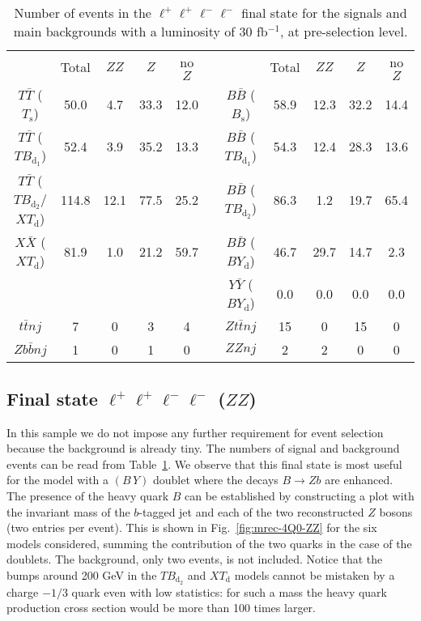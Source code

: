 \documentclass[12pt,a4paper]{article}
\newcommand{\TT}{T \bar T}
\newcommand{\BB}{B \bar B}
\newcommand{\XX}{X \bar X}
\newcommand{\YY}{Y \bar Y}
\newcommand{\Ts}{T_\text{s}}
\newcommand{\Bs}{B_\text{s}}
\newcommand{\TBd}{TB_{\text{d}_1}}
\newcommand{\TBD}{TB_{\text{d}_2}}
\newcommand{\XTd}{XT_\text{d}}
\newcommand{\BYd}{BY_\text{d}}
\newcommand{\BY}{(B \, Y)}
\begin{document}
\begin{table}[htb]
\begin{center}
\begin{small}
\begin{tabular}{ccccccccccc}
               & Total & $ZZ$ & $Z$  & no $Z$ & \quad &          & Total & $ZZ$ & $Z$ & no $Z$
\\[1mm]
$\TT$ ($\Ts$)  & 50.0  & 4.7  & 33.3 & 12.0   & & $\BB$ ($\Bs$)  & 58.9 & 12.3 & 32.2 & 14.4 \\
$\TT$ ($\TBd$) & 52.4  & 3.9  & 35.2 & 13.3   & & $\BB$ ($\TBd$) & 54.3 & 12.4 & 28.3 & 13.6 \\
$\TT$ ($\TBD$/$\XTd$) & 114.8 & 12.1 & 77.5 & 25.2 & & $\BB$ ($\TBD$) & 86.3 & 1.2 & 19.7 & 65.4 \\
$\XX$ ($\XTd$) & 81.9  & 1.0  & 21.2 & 59.7   & & $\BB$ ($\BYd$) & 46.7 & 29.7 & 14.7 & 2.3\\
               &       &      &      &        & & $\YY$ ($\BYd$) & 0.0  & 0.0  & 0.0  & 0.0  \\
\hline
$t \bar t nj$  & 7     & 0    & 3    & 4      & & $Z t \bar tnj$ & 15   & 0    &  15  & 0 \\
$Z b \bar bnj$ & 1     & 0    & 1    & 0      & & $ZZnj$         & 2    & 2    &  0   & 0
\end{tabular}
\end{small}
\end{center}
\caption{Number of events in the $\ell^+ \ell^+ \ell^- \ell^-$ final state for
the signals and main backgrounds with a luminosity of 30 fb$^{-1}$, at pre-selection level.}
\label{tab:nsnb-4Q0}
\end{table}



\subsection{Final state $\ell^+ \ell^+ \ell^- \ell^-$ ($ZZ$)}

In this sample we do not impose any further requirement for event selection because the background is already tiny. The numbers of signal and background events can be read from Table~\ref{tab:nsnb-4Q0}.
We observe that this final state is most useful for the model with a $\BY$ doublet where the decays $B \to Zb$ are enhanced. The presence of the heavy quark $B$ can be established by constructing a plot  with the invariant mass of the $b$-tagged jet and each of the two reconstructed $Z$ bosons
(two entries per event).
This is shown in Fig.~\ref{fig:mrec-4Q0-ZZ} for the six models considered, summing the contribution of the two quarks in the case of the doublets. The background, only two events, is not included. Notice that the bumps around 200 GeV in the $\TBD$ and $\XTd$ models cannot be mistaken by a charge $-1/3$ quark even with low statistics: for such a mass the heavy quark production cross section would be more than 100 times larger.
\end{document}
